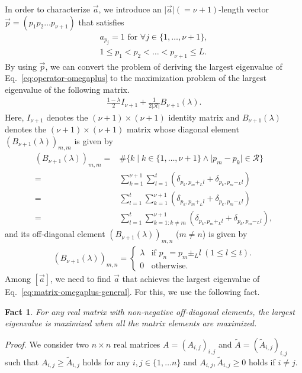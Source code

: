\documentclass[twocolumn,superscriptaddress,pra,footinbib,notitlepage]{revtex4-1}
\newcommand{\1}{\mbox{1}\hspace{-0.25em}\mbox{l}}
\newcommand{\abs}[1]{\lvert#1\rvert}
\newtheorem{fact}{Fact}
\begin{document}
In order to characterize $\vec{a}$, we introduce an $\abs{\vec{a}}(=\nu+1)$-length vector $\vec{p}=(p_1p_2\dots p_{\nu+1})$ that satisfies
\begin{align}
a_{p_j}=1\textrm{ for }\forall j\in\{1,\dots,\nu+1\},\\
1\leq p_1<p_2<\dots<p_{\nu+1}\leq L.
\end{align}
By using $\vec{p}$, we can convert the problem of deriving the largest eigenvalue of Eq.~\eqref{eq:operator-omegaplus} to the maximization problem of the largest eigenvalue of the following matrix.
\begin{align}
\frac{1-\lambda}{2}I_{\nu+1}+\frac{1}{2\abs{\mathcal{R}}}B_{\nu+1}(\lambda).\label{eq:matrix-omegaplus-general}
\end{align}
Here, $I_{\nu+1}$ denotes the $(\nu+1)\times(\nu+1)$ identity matrix and $B_{\nu+1}(\lambda)$ denotes the $(\nu+1)\times(\nu+1)$ matrix whose diagonal element $\left(B_{\nu+1}(\lambda)\right)_{m, m}$ is given by
\begin{align}
\left(B_{\nu+1}(\lambda)\right)_{m, m}=&\#\{k\mid k\in\{1, \dots, \nu+1\}\wedge\abs{p_m-p_k}\in\mathcal{R}\}\nonumber\\
=&\sum_{k=1}^{\nu+1}\sum_{l=1}^{t}\left(\delta_{p_k, p_m+_Ll}+\delta_{p_k, p_m-_Ll}\right)\nonumber\\
=&\sum_{l=1}^{t}\sum_{k=1}^{\nu+1}\left(\delta_{p_k, p_m+_Ll}+\delta_{p_k, p_m-_Ll}\right)\nonumber\\
=&\sum_{l=1}^{t}\sum_{k=1:k\neq m}^{\nu+1}\left(\delta_{p_k, p_m+_Ll}+\delta_{p_k, p_m-_Ll}\right),
\end{align}
and its off-diagonal element $\left(B_{\nu+1}(\lambda)\right)_{m, n}$ ($m\neq n$) is given by
\begin{align}
\left(B_{\nu+1}(\lambda)\right)_{m, n}=
\begin{cases}
\lambda&\textrm{if }p_n=p_m\pm_Ll~(1\leq l\leq t).\\
0&\textrm{otherwise}.
\end{cases}
\end{align}
Among $[\vec{a}]$, we need to find $\vec{a}$ that achieves the largest eigenvalue of Eq.~\eqref{eq:matrix-omegaplus-general}.
For this, we use the following fact.
\begin{fact}
For any real matrix with non-negative off-diagonal elements, the largest eigenvalue is maximized when all the matrix elements are maximized.
\label{fact:maximized-matrix-form}
\end{fact}
\textit{Proof.}
We consider two $n\times n$ real matrices $A=(A_{i, j})_{i, j}$ and $\tilde{A}=(\tilde{A}_{i, j})_{i, j}$ such that $A_{i, j}\geq\tilde{A}_{i,j}$ holds for any $i, j\in\{1,\dots n\}$ and $A_{i, j}, \tilde{A}_{i, j}\geq0$ holds if $i\neq j$.
\end{document}
